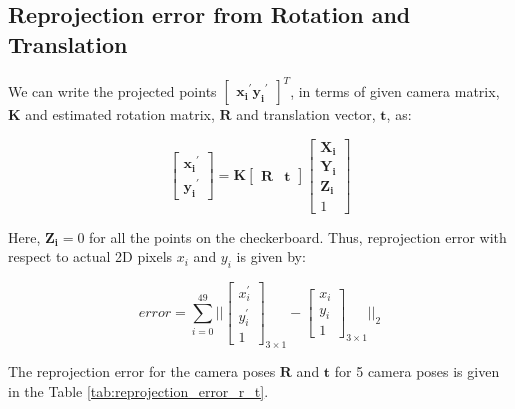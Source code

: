 \documentclass{article}
\begin{document}
\subsection{Reprojection error from Rotation and Translation}
We can write the projected points $\begin{bmatrix} \mathbf{x_i}^{'} \mathbf{y_i}^{'} \end{bmatrix}^T$, in terms of given camera matrix, $\mathbf{K}$ and estimated rotation matrix, 
$\mathbf{R}$ and translation vector, $\mathbf{t}$, as:

\begin{equation}
    \begin{bmatrix} \mathbf{x_i}^{'} \\ \mathbf{y_i}^{'} \end{bmatrix} = \mathbf{K} \begin{bmatrix} \mathbf{R} & \mathbf{t} \end{bmatrix} \begin{bmatrix} \mathbf{X_i} \\ \mathbf{Y_i} \\ \mathbf{Z_i} \\ 1 \end{bmatrix}
\end{equation}

Here, $\mathbf{Z_i}=0$ for all the points on the checkerboard. Thus, reprojection error with respect to actual 2D pixels $x_i$ and $y_i$ is given by:


\begin{equation}
    error = \sum_{i=0}^{49} || \begin{bmatrix} x_i^{'} \\ y_i^{'} \\ 1 \end{bmatrix}_{3 \times 1} - \begin{bmatrix} x_i \\ y_i \\ 1 \end{bmatrix}_{3 \times 1} ||_2
\end{equation}

The reprojection error for the camera poses $\mathbf{R}$ and $\mathbf{t}$ for 5 camera poses is given in the Table \ref{tab:reprojection_error_r_t}.
\end{document}
